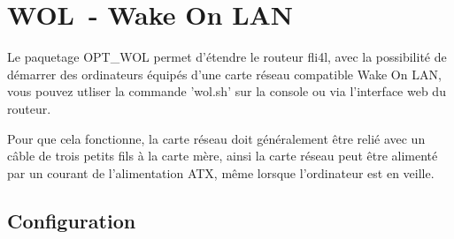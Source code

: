 
{
\section {WOL~- Wake On LAN}
}
Le paquetage OPT\_WOL permet d'étendre le routeur fli4l, avec la possibilité
de démarrer des ordinateurs équipés d'une carte réseau compatible Wake On LAN,
vous pouvez utliser la commande 'wol.sh' sur la console ou via l'interface web
du routeur.

Pour que cela fonctionne, la carte réseau doit généralement être relié avec
un câble de trois petits fils à la carte mère, ainsi la carte réseau peut être
alimenté par un courant de l'alimentation ATX, même lorsque l'ordinateur est
en veille.

\subsection {Configuration}

